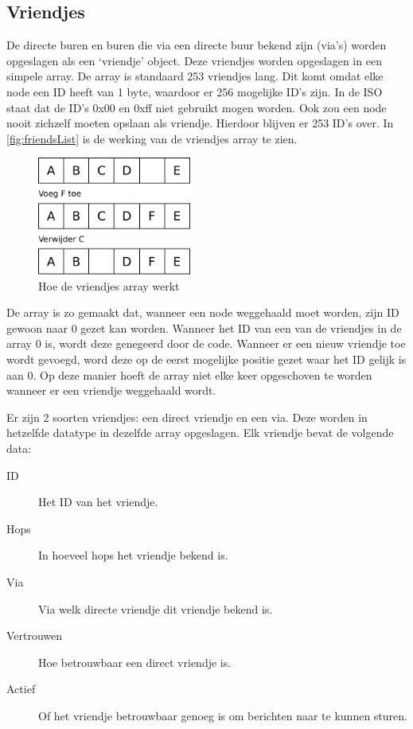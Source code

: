 \subsection{Vriendjes}

De directe buren en buren die via een directe buur bekend zijn (via's) worden opgeslagen als een `vriendje' object. Deze vriendjes worden opgeslagen in een simpele array. De array is standaard 253 vriendjes lang. Dit komt omdat elke node een ID heeft van 1 byte, waardoor er 256 mogelijke ID's zijn. In de ISO staat dat de ID's 0x00 en 0xff niet gebruikt mogen worden. Ook zou een node nooit zichzelf moeten opslaan als vriendje. Hierdoor blijven er 253 ID's over.
In \autoref{fig:friendsList} is de werking van de vriendjes array te zien.


\begin{figure}[ht]
    \centering
    \includegraphics[width=0.45\textwidth]{img/friendList.pdf}
    \caption{Hoe de vriendjes array werkt}
    \label{fig:friendsList}
\end{figure}

De array is zo gemaakt dat, wanneer een node weggehaald moet worden, zijn ID gewoon naar 0 gezet kan worden. Wanneer het ID van een van de vriendjes in de array 0 is, wordt deze genegeerd door de code. Wanneer er een nieuw vriendje toe wordt gevoegd, word deze op de eerst mogelijke positie gezet waar het ID gelijk is aan 0. Op deze manier hoeft de array niet elke keer opgeschoven te worden wanneer er een vriendje weggehaald wordt.

Er zijn 2 soorten vriendjes: een direct vriendje en een via. Deze worden in hetzelfde datatype in dezelfde array opgeslagen. Elk vriendje bevat de volgende data:
\begin{description}
    \item[ID]       Het ID van het vriendje.
    \item[Hops]     In hoeveel hops het vriendje bekend is.
    \item[Via]      Via welk directe vriendje dit vriendje bekend is.
    \item[Vertrouwen]    Hoe betrouwbaar een direct vriendje is.
    \item[Actief]   Of het vriendje betrouwbaar genoeg is om berichten naar te kunnen sturen.
\end{description}

